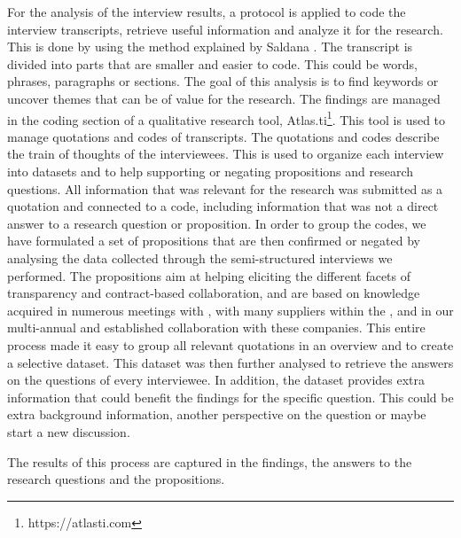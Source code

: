  For the analysis of the interview results, a protocol is applied to code the interview transcripts, retrieve useful information and analyze it for the research. This is done by using the method explained by Saldana \cite{saldana2015coding}. The transcript is divided into parts that are smaller and easier to code. This could be words, phrases, paragraphs or sections. The goal of this analysis is to find keywords or uncover themes that can be of value for the research. The findings are managed in the coding section of a qualitative research tool, Atlas.ti\footnote{https://atlasti.com}. %
This tool is used to manage quotations and codes of transcripts. The quotations and codes describe the train of thoughts of the interviewees. This is used to organize each interview into datasets and to help supporting or negating propositions and research questions. All information that was relevant for the research was submitted as a quotation and connected to a code, including information that was not a direct answer to a research question or proposition. 
In order to group the codes, we have formulated a set of propositions that are then confirmed or negated by analysing the data collected through the semi-structured interviews we performed.
The propositions aim at helping eliciting the different facets of transparency and contract-based collaboration, and are based on knowledge acquired in numerous meetings with \company{}, with many suppliers within the ,
and in our multi-annual and established collaboration with these companies. 
This entire process made it easy to group all relevant quotations in an overview and to create a selective dataset. %
This dataset was then further analysed to retrieve the answers on the questions of every interviewee. In addition, the dataset provides extra information that could benefit the findings for the specific question. This could be extra background information, another perspective on the question or maybe start a new discussion. 

The results of this process are captured in the findings, the answers to the research questions and the propositions.

